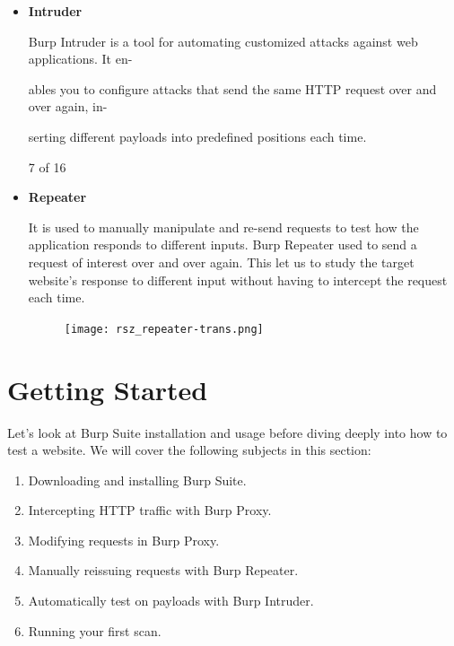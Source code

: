 \documentclass[
	a4paper, %
	12pt, %
]{CSSullivanBusinessReport}
\begin{document}
\begin{itemize}
\item \textbf{Intruder}
\begin{fullwidth}
    Burp Intruder is a tool for automating customized attacks against web applications. It en-

ables you to configure attacks that send the same HTTP request over and over again, in-

serting different payloads into predefined positions each time.
\end{fullwidth}

7 of 16



\item \textbf{Repeater}
\begin{fullwidth}
   It is used to  manually manipulate and re-send requests to test how the application responds to different inputs. Burp Repeater used to send a request of interest over and over again. This let us to study the target website's response to different input without having to intercept the request each time.
  \begin{figure}[H]
      \centering
      \texttt{[image: rsz\_repeater-trans.png]}
  \end{figure}
\end{fullwidth}
\end{itemize}

\section*{Getting Started}

\begin{fullwidth}
    Let's look at Burp Suite installation and usage before diving deeply into how to test a website. We will cover the following subjects in this section: 
\begin{enumerate}
	\item Downloading and installing Burp Suite.
        \item Intercepting HTTP traffic with Burp Proxy.
        \item Modifying requests in Burp Proxy.
        \item Manually reissuing requests with Burp Repeater.
        \item Automatically test on payloads with Burp Intruder.
        \item Running your first scan.
\end{enumerate}
\end{fullwidth}
\end{document}
